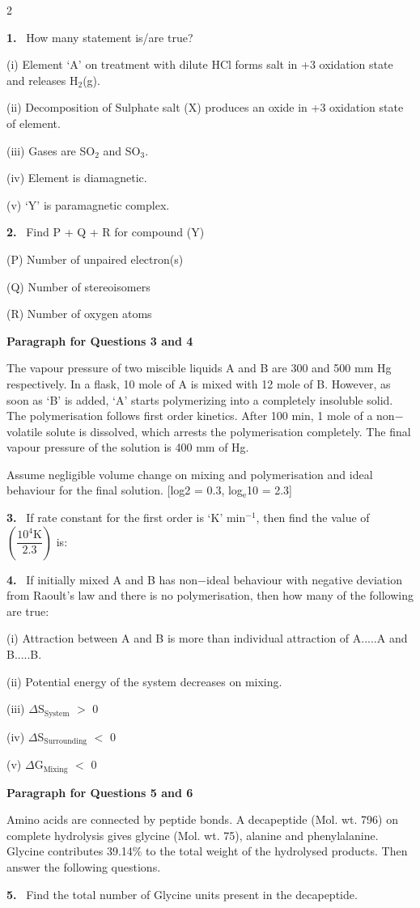 \documentclass[10pt]{extarticle}
\newcommand{\qn}[1]{\par\smallskip\noindent\textbf{#1.}~}
\newcommand{\paraq}[2]{\par\smallskip\noindent\textbf{Paragraph for Questions #1 and #2}\par}
\begin{document}
\begin{multicols}{2}
\qn{1} How many statement is/are true?\par
(i) Element `A' on treatment with dilute HCl forms salt in +3 oxidation state and releases H$_2$(g).\par
(ii) Decomposition of Sulphate salt (X) produces an oxide in +3 oxidation state of element.\par
(iii) Gases are SO$_2$ and SO$_3$.\par
(iv) Element is diamagnetic.\par
(v) `Y' is paramagnetic complex.
\qn{2} Find P + Q + R for compound (Y)\par
(P) Number of unpaired electron(s)\par
(Q) Number of stereoisomers\par
(R) Number of oxygen atoms
\paraq{3}{4}
The vapour pressure of two miscible liquids A and B are 300 and 500 mm Hg respectively. In a flask, 10 mole of A is mixed with 12 mole of B. However, as soon as `B' is added, `A' starts polymerizing into a completely insoluble solid. The polymerisation follows first order kinetics. After 100 min, 1 mole of a non$-$volatile solute is dissolved, which arrests the polymerisation completely. The final vapour pressure of the solution is 400 mm of Hg.\par
Assume negligible volume change on mixing and polymerisation and ideal behaviour for the final solution. [log2 = 0.3, log$_\mathrm e$10 = 2.3]
\qn{3} If rate constant for the first order is `K' min$^{-1}$, then find the value of $\left(\dfrac{10^4\mathrm K}{2.3}\right)$ is:
\qn{4} If initially mixed A and B has non$-$ideal behaviour with negative deviation from Raoult's law and there is no polymerisation, then how many of the following are true:\par
(i) Attraction between A and B is more than individual attraction of A.....A and B.....B.\par
(ii) Potential energy of the system decreases on mixing.\par
(iii) $\Delta$S$_{\mathrm{System}}$ $>$ 0\par
(iv) $\Delta$S$_{\mathrm{Surrounding}}$ $<$ 0\par
(v) $\Delta$G$_{\mathrm{Mixing}}$ $<$ 0
\paraq{5}{6}
Amino acids are connected by peptide bonds. A decapeptide (Mol. wt. 796) on complete hydrolysis gives glycine (Mol. wt. 75), alanine and phenylalanine. Glycine contributes 39.14\% to the total weight of the hydrolysed products. Then answer the following questions.
\qn{5} Find the total number of Glycine units present in the decapeptide.

\end{multicols}
\end{document}
